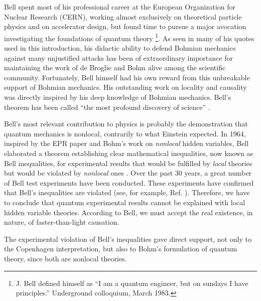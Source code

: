 \documentclass[nofootinbib, secnumarabic, amsmath, nobibnotes,10pt,aps,pra]{revtex4-1}
\begin{document}
Bell spent most of his professional career at the European
Organization for Nuclear Research (CERN), working almost exclusively
on theoretical particle physics and on accelerator design, but found
time to pursue a major avocation investigating the foundations of
quantum theory \footnote{J. Bell defined himself as ``I am a quantum engineer, but on sundays I have principles.'' Underground colloquium, March 1983.}. As seen in many of his quotes used in this
introduction, his didactic ability to defend Bohmian mechanics
against many unjustified attacks has been of extraordinary
importance for maintaining the work of de Broglie and Bohm alive
among the scientific community. Fortunately, Bell himself had his
own reward from this unbreakable support of Bohmian mechanics. His
outstanding work on locality and causality was directly inspired by
his deep knowledge of Bohmian mechanics. Bell's theorem has been
called ``the most profound discovery of science''
\cite{om.stapp1977}.

Bell's most relevant contribution to physics is probably the
demonstration that quantum mechanics is nonlocal, contrarily to what
Einstein expected. In 1964, inspired by the EPR paper
\cite{om.Einstein_rosen1935} and Bohm's work on \textit{nonlocal}
hidden variables, Bell elaborated a theorem establishing clear
mathematical inequalities, now known as Bell inequalities, for
experimental results that would be fulfilled by \textit{local}
theories but would be violated by \textit{nonlocal} ones
\cite{om.Bell1964}. Over the past 30 years, a great number of Bell
test experiments have been conducted. These experiments have
confirmed that Bell's inequalities are violated (see, for example,
Ref. \cite{om.aspect1982}). Therefore, we have to conclude that
quantum experimental results cannot be explained with local hidden
variable theories. According to Bell, we must accept the real
existence, in nature, of faster-than-light causation.

The experimental violation of Bell's inequalities gave direct support, not only to the Copenhagen interpretation, but also to Bohm's formulation of quantum theory, since both are nonlocal theories.
\end{document}
